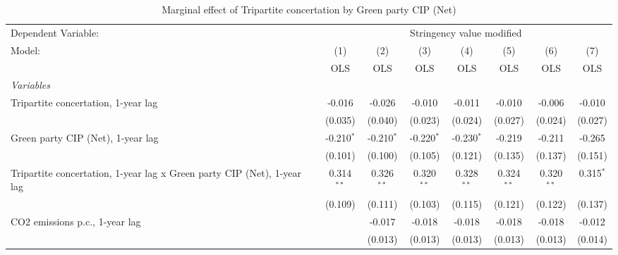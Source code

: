 
\begin{table}[htbp]
   \caption{Marginal effect of Tripartite concertation by Green party CIP (Net)}
   \centering
   \begin{tabular}{lccccccc}
      \toprule
      Dependent Variable: & \multicolumn{7}{c}{Stringency value modified}\\
      Model:                                                                  & (1)          & (2)          & (3)          & (4)          & (5)          & (6)          & (7)\\  
                                                                              &  OLS         & OLS          & OLS          & OLS          & OLS          & OLS          & OLS\\  
      \midrule
      \emph{Variables}\\
      Tripartite concertation, 1-year lag                                     & -0.016       & -0.026       & -0.010       & -0.011       & -0.010       & -0.006       & -0.010\\   
                                                                              & (0.035)      & (0.040)      & (0.023)      & (0.024)      & (0.027)      & (0.024)      & (0.027)\\   
      Green party CIP (Net), 1-year lag                                       & -0.210$^{*}$ & -0.210$^{*}$ & -0.220$^{*}$ & -0.230$^{*}$ & -0.219       & -0.211       & -0.265\\   
                                                                              & (0.101)      & (0.100)      & (0.105)      & (0.121)      & (0.135)      & (0.137)      & (0.151)\\   
      Tripartite concertation, 1-year lag x Green party CIP (Net), 1-year lag & 0.314$^{**}$ & 0.326$^{**}$ & 0.320$^{**}$ & 0.328$^{**}$ & 0.324$^{**}$ & 0.320$^{**}$ & 0.315$^{*}$\\   
                                                                              & (0.109)      & (0.111)      & (0.103)      & (0.115)      & (0.121)      & (0.122)      & (0.137)\\   
      CO2 emissions p.c., 1-year lag                                          &              & -0.017       & -0.018       & -0.018       & -0.018       & -0.018       & -0.012\\   
                                                                              &              & (0.013)      & (0.013)      & (0.013)      & (0.013)      & (0.013)      & (0.014)\\   

\end{tabular}
\end{table}
